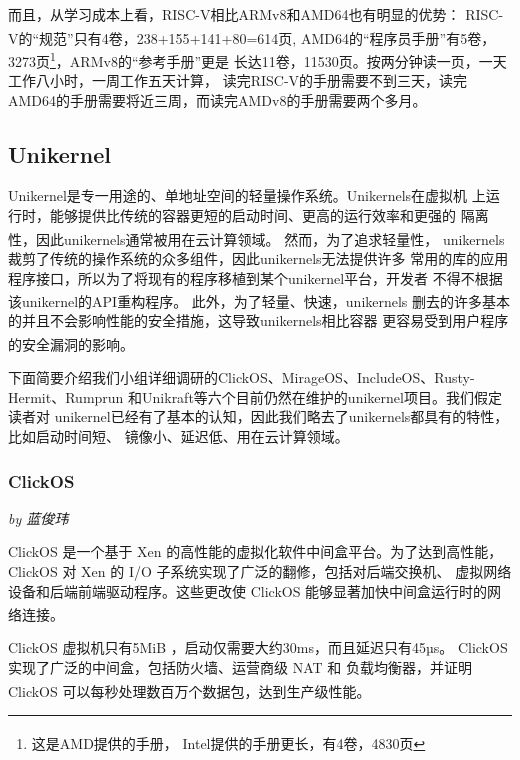 \documentclass[UTF8,fontset=none,linespread=1.15]{ctexart}
\let\nosupcite\cite
\renewcommand*{\cite}[1]{\textsuperscript{\nosupcite{#1}}}
\newcommand{\sectionauthor}[1]{%
\vspace*{-5ex}
\noindent\textrm{\hfill\textit{by #1}}
\vspace*{2ex}\par}
\begin{document}
而且，从学习成本上看，RISC-V相比ARMv8和AMD64也有明显的优势：
RISC-V的“规范”只有4卷，238\cite{bib:riscv-spec1}+155\cite{bib:riscv-spec2}+141\cite{bib:riscv-spec3}+80\cite{bib:riscv-spec4}=614页,
AMD64的“程序员手册”有5卷，3273页\cite{bib:amd64-manual}\footnote{这是AMD提供的手册，
Intel提供的手册更长，有4卷，4830页\cite{bib:amd64-manual-intel}}，ARMv8的“参考手册”更是
长达11卷，11530页\cite{bib:armv8-reference}。按两分钟读一页，一天工作八小时，一周工作五天计算，
读完RISC-V的手册需要不到三天，读完AMD64的手册需要将近三周，而读完AMDv8的手册需要两个多月。

\subsection{Unikernel}
Unikernel是专一用途的、单地址空间的轻量操作系统。Unikernels在虚拟机
上运行时，能够提供比传统的容器更短的启动时间、更高的运行效率和更强的
隔离性，因此unikernels通常被用在云计算领域。\cite{bib:unikernel}
然而，为了追求轻量性，
unikernels裁剪了传统的操作系统的众多组件，因此unikernels无法提供许多
常用的库的应用程序接口，所以为了将现有的程序移植到某个unikernel平台，开发者
不得不根据该unikernel的API重构程序。\cite{bib:unikraft}
此外，为了轻量、快速，unikernels
删去的许多基本的并且不会影响性能的安全措施，这导致unikernels相比容器
更容易受到用户程序的安全漏洞的影响。\cite{bib:unikernel-secuirty}

下面简要介绍我们小组详细调研的ClickOS、MirageOS、IncludeOS、Rusty-Hermit、Rumprun
和Unikraft等六个目前仍然在维护的unikernel项目。我们假定读者对
unikernel已经有了基本的认知，因此我们略去了unikernels都具有的特性，比如启动时间短、
镜像小、延迟低、用在云计算领域。

\subsubsection{ClickOS}\sectionauthor{蓝俊玮}

ClickOS 是一个基于 Xen 的高性能的虚拟化软件中间盒平台。为了达到高性能，
ClickOS 对 Xen 的 I/O 子系统实现了广泛的翻修，包括对后端交换机、
虚拟网络设备和后端前端驱动程序。这些更改使 ClickOS 能够显著加快中间盒运行时的网络连接。\cite{bib:12-clickos}

ClickOS 虚拟机只有5MiB ，启动仅需要大约30ms，而且延迟只有45µs。
ClickOS 实现了广泛的中间盒，包括防火墙、运营商级 NAT 和
负载均衡器，并证明 ClickOS 可以每秒处理数百万个数据包，达到生产级性能。\cite{bib:12-clickos}\cite{bib:13-clickos2}
\end{document}
